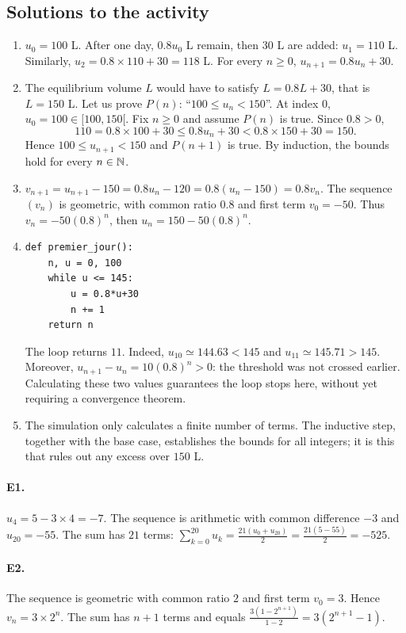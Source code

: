 \subsection{Solutions to the activity}\begin{enumerate}
\item $u_0=100$ L. After one day, $0.8u_0$ L remain, then $30$ L are added: $u_1=110$ L. Similarly, $u_2=0.8\times110+30=118$ L. For every $n\ge0$, $u_{n+1}=0.8u_n+30$.
\item The equilibrium volume $L$ would have to satisfy $L=0.8L+30$, that is $L=150$ L. Let us prove $P(n)$: ``$100\le u_n<150$''. At index $0$, $u_0=100\in[100,150[$. Fix $n\ge0$ and assume $P(n)$ is true. Since $0.8>0$,
\[110=0.8\times100+30\le0.8u_n+30<0.8\times150+30=150.\]
Hence $100\le u_{n+1}<150$ and $P(n+1)$ is true. By induction, the bounds hold for every $n\in\mathbb N$.
\item $v_{n+1}=u_{n+1}-150=0.8u_n-120=0.8(u_n-150)=0.8v_n$. The sequence $(v_n)$ is geometric, with common ratio $0.8$ and first term $v_0=-50$. Thus $v_n=-50(0.8)^n$, then $u_n=150-50(0.8)^n$.
\item 
\begin{lstlisting}
def premier_jour():
    n, u = 0, 100
    while u <= 145:
        u = 0.8*u+30
        n += 1
    return n
\end{lstlisting}
The loop returns $11$. Indeed, $u_{10}\simeq144.63<145$ and $u_{11}\simeq145.71>145$. Moreover, $u_{n+1}-u_n=10(0.8)^n>0$: the threshold was not crossed earlier. Calculating these two values guarantees the loop stops here, without yet requiring a convergence theorem.
\item The simulation only calculates a finite number of terms. The inductive step, together with the base case, establishes the bounds for all integers; it is this that rules out any excess over $150$ L.
\end{enumerate}

\paragraph{E1.}$u_4=5-3\times4=-7$. The sequence is arithmetic with common difference $-3$ and $u_{20}=-55$. The sum has $21$ terms: $\sum_{k=0}^{20}u_k=\frac{21(u_0+u_{20})}{2}=\frac{21(5-55)}{2}=-525$.

\paragraph{E2.}The sequence is geometric with common ratio $2$ and first term $v_0=3$. Hence $v_n=3\times2^n$. The sum has $n+1$ terms and equals $\frac{3(1-2^{n+1})}{1-2}=3(2^{n+1}-1)$.

